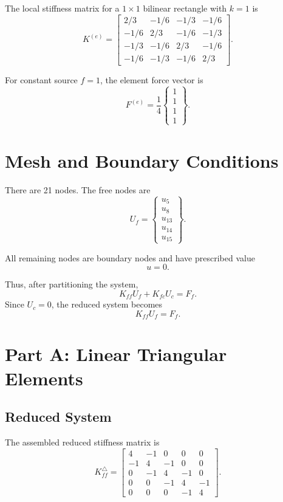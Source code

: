 \documentclass[14pt,a4paper]{article}
\newcommand{\vect}[1]{\begin{Bmatrix}#1\end{Bmatrix}}
\newcommand{\mat}[1]{\begin{bmatrix}#1\end{bmatrix}}
\begin{document}
The local stiffness matrix for a $1\times1$ bilinear rectangle with $k=1$ is
\begin{equation}
K^{(e)}=
\mat{
2/3 & -1/6 & -1/3 & -1/6\\
-1/6 & 2/3 & -1/6 & -1/3\\
-1/3 & -1/6 & 2/3 & -1/6\\
-1/6 & -1/3 & -1/6 & 2/3
}.
\end{equation}

For constant source $f=1$, the element force vector is
\begin{equation}
    F^{(e)}=\frac{1}{4}\vect{1\\1\\1\\1}.
\end{equation}

\section{Mesh and Boundary Conditions}

There are 21 nodes. The free nodes are
\begin{equation}
    U_f=\vect{u_5\\u_8\\u_{13}\\u_{14}\\u_{15}}.
\end{equation}

All remaining nodes are boundary nodes and have prescribed value
\begin{equation}
    u=0.
\end{equation}

Thus, after partitioning the system,
\begin{equation}
    K_{ff}U_f+K_{fc}U_c=F_f.
\end{equation}
Since $U_c=0$, the reduced system becomes
\begin{equation}
    K_{ff}U_f=F_f.
\end{equation}

\section{Part A: Linear Triangular Elements}

\subsection{Reduced System}

The assembled reduced stiffness matrix is
\begin{equation}
K_{ff}^{\triangle}=
\mat{
4 & -1 & 0 & 0 & 0\\
-1 & 4 & -1 & 0 & 0\\
0 & -1 & 4 & -1 & 0\\
0 & 0 & -1 & 4 & -1\\
0 & 0 & 0 & -1 & 4
}.
\end{equation}
\end{document}
